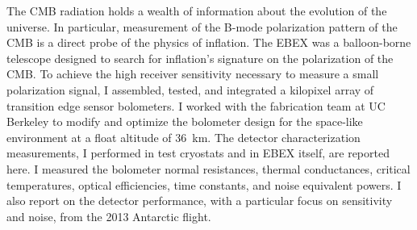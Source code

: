 
The \ac{CMB} radiation holds a wealth of information about the evolution of the universe. 
In particular, measurement of the B-mode polarization pattern of the \ac{CMB} is a direct probe of the physics of inflation. 
The \ac{EBEX} was a balloon-borne telescope designed to search for inflation's signature on the polarization of the \ac{CMB}.  
To achieve the high receiver sensitivity necessary to measure a small polarization signal, I assembled, tested, and integrated a kilopixel array of transition edge sensor bolometers. 
I worked with the fabrication team at UC Berkeley to modify and optimize the bolometer design for the space-like environment at a float altitude of 36~km. 
The detector characterization measurements, I performed in test cryostats and in \ac{EBEX} itself, are reported here. 
I measured the bolometer normal resistances, thermal conductances, critical temperatures, optical efficiencies, time constants, and noise equivalent powers. 
I also report on the detector performance, with a particular focus on sensitivity and noise, from the 2013 Antarctic flight. 


